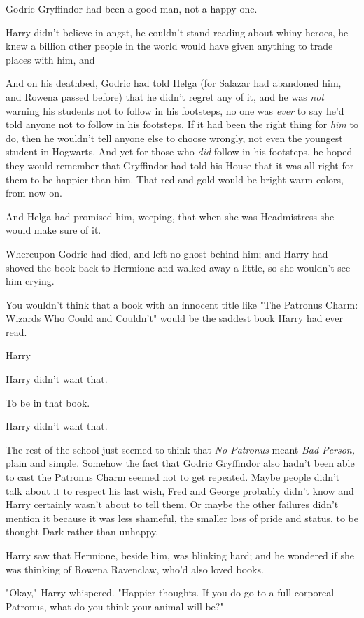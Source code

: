 Godric Gryffindor had been a good man, not a happy one.

Harry didn't believe in angst, he couldn't stand reading about whiny heroes, he
knew a billion other people in the world would have given anything to trade
places with him, and{\el}

And on his deathbed, Godric had told Helga (for Salazar had abandoned him, and
Rowena passed before) that he didn't regret any of it, and he was \emph{not}
warning his students not to follow in his footsteps, no one was \emph{ever} to
say he'd told anyone not to follow in his footsteps. If it had been the right
thing for \emph{him} to do, then he wouldn't tell anyone else to choose
wrongly, not even the youngest student in Hogwarts. And yet for those who
\emph{did} follow in his footsteps, he hoped they would remember that
Gryffindor had told his House that it was all right for them to be happier than
him. That red and gold would be bright warm colors, from now on.

And Helga had promised him, weeping, that when she was Headmistress she would
make sure of it.

Whereupon Godric had died, and left no ghost behind him; and Harry had shoved
the book back to Hermione and walked away a little, so she wouldn't see him
crying.

You wouldn't think that a book with an innocent title like "The Patronus Charm:
Wizards Who Could and Couldn't" would be the saddest book Harry had ever read.

Harry{\el}

Harry didn't want that.

To be in that book.

Harry didn't want that.

The rest of the school just seemed to think that \emph{No Patronus} meant
\emph{Bad Person,} plain and simple. Somehow the fact that Godric Gryffindor
also hadn't been able to cast the Patronus Charm seemed not to get repeated.
Maybe people didn't talk about it to respect his last wish, Fred and George
probably didn't know and Harry certainly wasn't about to tell them. Or maybe
the other failures didn't mention it because it was less shameful, the smaller
loss of pride and status, to be thought Dark rather than unhappy.

Harry saw that Hermione, beside him, was blinking hard; and he wondered if she
was thinking of Rowena Ravenclaw, who'd also loved books.

"Okay," Harry whispered. "Happier thoughts. If you do go to a full corporeal
Patronus, what do you think your animal will be?"

